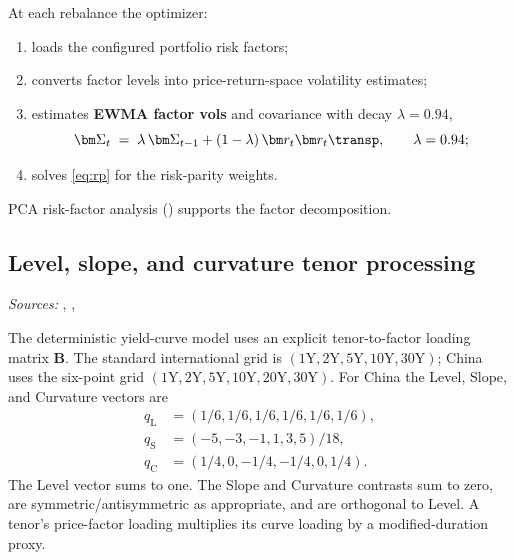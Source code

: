 At each rebalance the optimizer:
\begin{enumerate}
\item loads the configured portfolio risk factors;
\item converts factor levels into price-return-space volatility estimates;
\item estimates \textbf{EWMA factor vols} and covariance with decay
$\lambda = 0.94$,
\begin{equation}
\bm\Sigma_t \;=\; \lambda\,\bm\Sigma_{t-1}
   + (1-\lambda)\,\bm r_t \bm r_t\transp,
\qquad \lambda = 0.94;
\label{eq:ewma}
\end{equation}
\item solves \cref{eq:rp} for the risk-parity weights.
\end{enumerate}
PCA risk-factor analysis () supports the factor decomposition.

\subsection{Level, slope, and curvature tenor processing}
\textit{Sources: }, ,

The deterministic yield-curve model uses an explicit tenor-to-factor loading matrix
$\bm B$.  The standard international grid is $(1\mathrm{Y}, 2\mathrm{Y},
5\mathrm{Y}, 10\mathrm{Y}, 30\mathrm{Y})$; China uses the six-point grid
$(1\mathrm{Y}, 2\mathrm{Y}, 5\mathrm{Y}, 10\mathrm{Y}, 20\mathrm{Y},
30\mathrm{Y})$.  For China the Level, Slope, and Curvature vectors are
\begin{equation}
\begin{split}
q_{\mathrm{L}} &= (1/6, 1/6, 1/6, 1/6, 1/6, 1/6),\\
q_{\mathrm{S}} &= (-5, -3, -1, 1, 3, 5)/18,\\
q_{\mathrm{C}} &= (1/4, 0, -1/4, -1/4, 0, 1/4).
\end{split}
\label{eq:cn-lsc-basis}
\end{equation}
The Level vector sums to one.  The Slope and Curvature contrasts sum to zero,
are symmetric/antisymmetric as appropriate, and are orthogonal to Level.  A tenor's
price-factor loading multiplies its curve loading by a modified-duration proxy.

